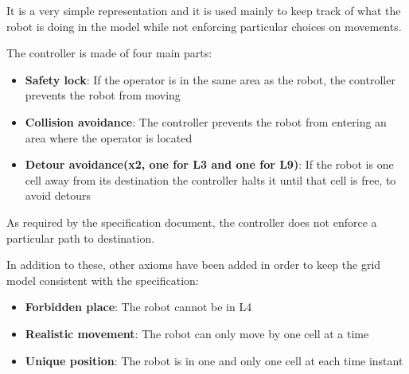 It is a very simple representation and it is used mainly to keep track of what the robot is doing in the model while not enforcing particular choices on movements.

The controller is made of four main parts:
\begin{itemize}
	\item \textbf{Safety lock}: If the operator is in the same area as the robot, the controller prevents the robot from moving
	
	\item \textbf{Collision avoidance}: The controller prevents the robot from entering an area where the operator is located
	
	\item \textbf{Detour avoidance(x2, one for L3 and one for L9)}: If the robot is one cell away from its destination the controller halts it until that cell is free, to avoid detours
\end{itemize}

As required by the specification document, the controller does not enforce a particular path to destination.

In addition to these, other axioms have been added in order to keep the grid model consistent with the specification:


\begin{itemize}
	\item \textbf{Forbidden place}: The robot cannot be in L4
	
	\item \textbf{Realistic movement}: The robot can only move by one cell at a time
	
	\item \textbf{Unique position}: The robot is in one and only one cell at each time instant
\end{itemize}